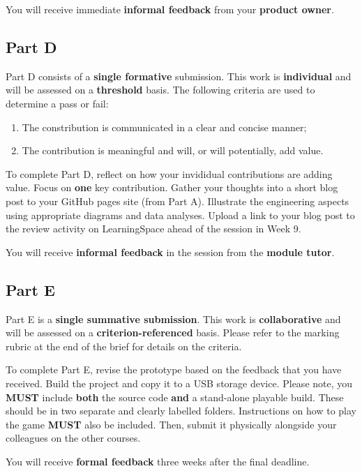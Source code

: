 \documentclass{../../fal_assignment}
\begin{document}
You will receive immediate \textbf{informal feedback} from your \textbf{product owner}.

\subsection*{Part D}

Part D consists of a \textbf{single formative} submission. This work is \textbf{individual} and will be assessed on a \textbf{threshold} basis.  The following criteria are used to determine a pass or fail:

\begin{enumerate}[label=(\alph*)]
	\item The constribution is communicated in a clear and concise manner;
	\item The contribution is meaningful and will, or will potentially, add value.
\end{enumerate}

To complete Part D, reflect on how your invididual contributions are adding value. Focus on \textbf{one} key contribution. Gather your thoughts into a short blog post to your GitHub pages site (from Part A). Illustrate the engineering aspects using appropriate diagrams and data analyses. Upload a link to your blog post to the review activity on LearningSpace ahead of the session in Week 9. 

You will receive \textbf{informal feedback} in the session from the \textbf{module tutor}.

\subsection*{Part E}

Part E is a \textbf{single summative submission}. This work is \textbf{collaborative} and will be assessed on a \textbf{criterion-referenced} basis. Please refer to the marking rubric at the end of the brief for details on the criteria.

To complete Part E, revise the prototype based on the feedback that you have received. Build the project and copy it to a USB storage device. Please note, you \textbf{MUST} include \textbf{both} the source code \textbf{and} a stand-alone playable build. These should be in two separate and clearly labelled folders. Instructions on how to play the game \textbf{MUST} also be included. Then, submit it physically alongside your colleagues on the other courses.

You will receive \textbf{formal feedback} three weeks after the final deadline.
\end{document}
